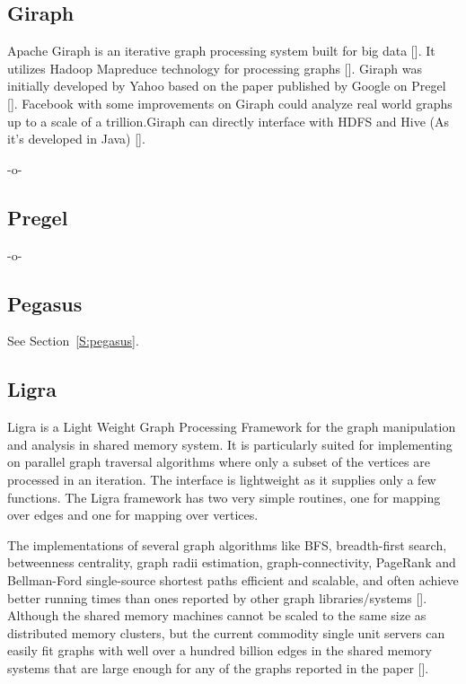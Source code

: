 \subsection{Giraph}

Apache Giraph is an iterative graph processing system built for big
data [\cite{www-giraph-apache}]. It utilizes Hadoop Mapreduce technology
for processing graphs [\cite{www-apache-giraph-wiki}].  Giraph was
initially developed by Yahoo based on the paper published by Google on
Pregel [\cite{www-apache-giraph-pcworld}].  Facebook with some
improvements on Giraph could analyze real world graphs up to a scale
of a trillion.Giraph can directly interface with HDFS and Hive (As
it's developed in Java) [\cite{www-apache-giraph-fb}].

     -o-
   
\subsection{Pregel}

-o- 

\subsection{Pegasus}

See Section~\ref{S:pegasus}.

\subsection{Ligra}

Ligra is a Light Weight Graph Processing Framework for the graph
manipulation and analysis in shared memory system. It is particularly
suited for implementing on parallel graph traversal algorithms where
only a subset of the vertices are processed in an iteration. The
interface is lightweight as it supplies only a few functions. The
Ligra framework has two very simple routines, one for mapping over
edges and one for mapping over vertices.

The implementations of several graph algorithms like BFS,
breadth-first search, betweenness centrality, graph radii estimation,
graph-connectivity, PageRank and Bellman-Ford single-source shortest
paths efficient and scalable, and often achieve better running times
than ones reported by other graph libraries/systems
[\cite{ligra-paper-2013}].  Although the shared memory machines cannot
be scaled to the same size as distributed memory clusters, but the
current commodity single unit servers can easily fit graphs with well
over a hundred billion edges in the shared memory systems that are
large enough for any of the graphs reported in the paper
[\cite{ligra-paper-2}].


